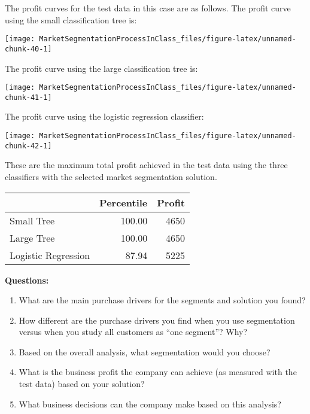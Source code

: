\documentclass[
]{article}
\providecommand{\tightlist}{%
  \setlength{\itemsep}{0pt}\setlength{\parskip}{0pt}}
\begin{document}
The profit curves for the test data in this case are as follows. The
profit curve using the small classification tree is:

\begin{center}\texttt{[image: MarketSegmentationProcessInClass\_files/figure-latex/unnamed-chunk-40-1]} \end{center}

The profit curve using the large classification tree is:

\begin{center}\texttt{[image: MarketSegmentationProcessInClass\_files/figure-latex/unnamed-chunk-41-1]} \end{center}

The profit curve using the logistic regression classifier:

\begin{center}\texttt{[image: MarketSegmentationProcessInClass\_files/figure-latex/unnamed-chunk-42-1]} \end{center}

These are the maximum total profit achieved in the test data using the
three classifiers with the selected market segmentation solution.

\begin{center}
\begin{longtable}{lrr}
\toprule
  & Percentile & Profit\\
\midrule
Small Tree & 100.00 & 4650\\
Large Tree & 100.00 & 4650\\
Logistic Regression & 87.94 & 5225\\
\bottomrule
\end{longtable}\end{center}

\textbf{Questions:}

\begin{enumerate}
\def\labelenumi{\arabic{enumi}.}
\tightlist
\item
  What are the main purchase drivers for the segments and solution you
  found?
\item
  How different are the purchase drivers you find when you use
  segmentation versus when you study all customers as ``one segment''?
  Why?
\item
  Based on the overall analysis, what segmentation would you choose?
\item
  What is the business profit the company can achieve (as measured with
  the test data) based on your solution?
\item
  What business decisions can the company make based on this analysis?
\end{enumerate}
\end{document}
